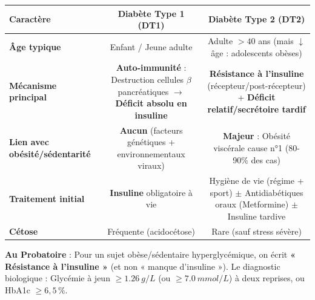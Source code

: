 \documentclass[11pt]{article}
\begin{document}
\begin{propriete}
\begin{center}
\begin{tabular}{|l|c|c|}\hline
\rowcolor{popblueL} \textbf{Caractère} & \textbf{Diabète Type 1 (DT1)} & \textbf{Diabète Type 2 (DT2)} \\ \hline
\textbf{Âge typique} & Enfant / Jeune adulte & Adulte $> 40$ ans (mais $\downarrow$ âge : adolescents obèses) \\ \hline
\textbf{Mécanisme principal} & \textbf{Auto-immunité} : Destruction cellules $\beta$ pancréatiques $\rightarrow$ \textbf{Déficit absolu en insuline} & \textbf{Résistance à l'insuline} (récepteur/post-récepteur) + \textbf{Déficit relatif/secrétoire tardif} \\ \hline
\textbf{Lien avec obésité/sédentarité} & \textbf{Aucun} (facteurs génétiques + environnementaux viraux) & \textbf{Majeur} : Obésité viscérale cause n°1 (80-90\% des cas) \\ \hline
\textbf{Traitement initial} & \textbf{Insuline} obligatoire à vie & Hygiène de vie (régime + sport) $\pm$ Antidiabétiques oraux (Metformine) $\pm$ Insuline tardive \\ \hline
\textbf{Cétose} & Fréquente (acidocétose) & Rare (sauf stress sévère) \\ \hline
\end{tabular}
\end{center}
\textbf{Au Probatoire} : Pour un sujet obèse/sédentaire hyperglycémique, on écrit \textbf{« Résistance à l'insuline »} (et non « manque d'insuline »). Le diagnostic biologique : Glycémie à jeun $\ge \SI{1,26}{g/L}$ (ou $\ge \SI{7,0}{mmol/L}$) à deux reprises, ou HbA1c $\ge 6,5\,\%$.
\end{propriete}
\end{document}
